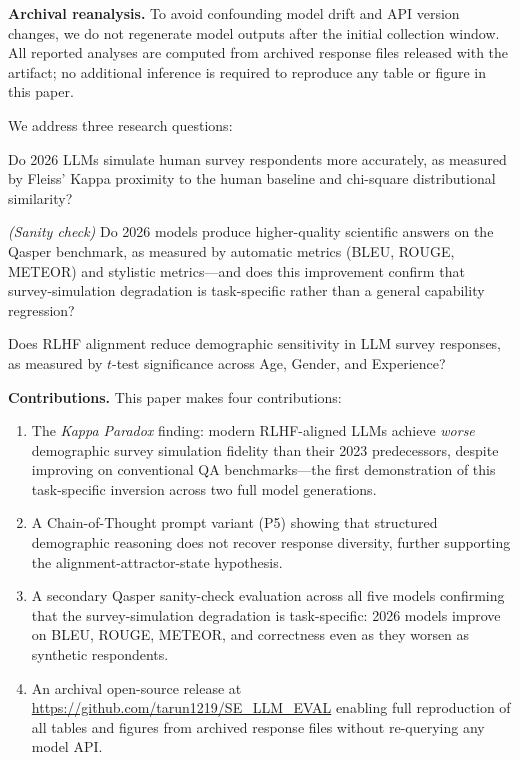 \documentclass[sigconf,nonacm]{acmart}
\newcommand{\kp}{\textit{Kappa Paradox}\xspace}
\begin{document}
\textbf{Archival reanalysis.}
To avoid confounding model drift and API version changes, we do not
regenerate model outputs after the initial collection window.
All reported analyses are computed from archived response files
released with the artifact; no additional inference is required to
reproduce any table or figure in this paper.

We address three research questions:
\begin{description}[leftmargin=1.2em,itemsep=0pt]
\item[\textbf{RQ1}] Do 2026 LLMs simulate human survey respondents more
  accurately, as measured by Fleiss' Kappa proximity to the human baseline
  and chi-square distributional similarity?
\item[\textbf{RQ2}] \emph{(Sanity check)} Do 2026 models produce
  higher-quality scientific answers on the Qasper benchmark, as measured
  by automatic metrics (BLEU, ROUGE, METEOR) and stylistic metrics---and
  does this improvement confirm that survey-simulation degradation is
  task-specific rather than a general capability regression?
\item[\textbf{RQ3}] Does RLHF alignment reduce demographic sensitivity in
  LLM survey responses, as measured by $t$-test significance across Age,
  Gender, and Experience?
\end{description}

\noindent\textbf{Contributions.} This paper makes four contributions:
\begin{enumerate}[leftmargin=1.4em,itemsep=0pt]
\item The \kp finding: modern RLHF-aligned LLMs achieve \emph{worse}
  demographic survey simulation fidelity than their 2023 predecessors,
  despite improving on conventional QA benchmarks---the first demonstration
  of this task-specific inversion across two full model generations.
\item A Chain-of-Thought prompt variant (P5) showing that structured
  demographic reasoning does not recover response diversity,
  further supporting the alignment-attractor-state hypothesis.
\item A secondary Qasper sanity-check evaluation across all five models
  confirming that the survey-simulation degradation is task-specific:
  2026 models improve on BLEU, ROUGE, METEOR, and correctness even as they
  worsen as synthetic respondents.
\item An archival open-source release at
  \url{https://github.com/tarun1219/SE\_LLM\_EVAL}
  enabling full reproduction of all tables and figures from archived response
  files without re-querying any model API.
\end{enumerate}
\end{document}
